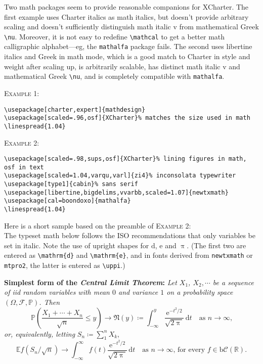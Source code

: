 \documentclass[11pt]{article}
\begin{document}
Two math packages seem to provide reasonable companions for \textsf{XCharter}. The first example uses Charter italics as math italics, but doesn't provide arbitrary scaling and doesn't sufficiently distinguish math italic v from mathematical Greek \verb|\nu|. Moreover, it is not easy to redefine \verb|\mathcal| to get a better math calligraphic alphabet---eg, the {\tt mathalfa} package fails. The second uses \textsf{libertine} italics and Greek in math mode, which is a good match to Charter in style and weight after scaling up, is arbitrarily scalable, has distinct math italic v and mathematical Greek \verb|\nu|, and is completely compatible with {\tt mathalfa}.

\textsc{Example 1:}
\begin{verbatim}
\usepackage[charter,expert]{mathdesign}
\usepackage[scaled=.96,osf]{XCharter}% matches the size used in math
\linespread{1.04}
\end{verbatim}

\textsc{Example 2:}
\begin{verbatim}
\usepackage[scaled=.98,sups,osf]{XCharter}% lining figures in math, osf in text
\usepackage[scaled=1.04,varqu,varl]{zi4}% inconsolata typewriter
\usepackage[type1]{cabin}% sans serif
\usepackage[libertine,bigdelims,vvarbb,scaled=1.07]{newtxmath}
\usepackage[cal=boondoxo]{mathalfa}
\linespread{1.04}
\end{verbatim}
Here is a short sample based on the preamble of \textsc{Example 2}:\\[4pt]
\def\Pr{\ensuremath{\mathbb{P}}}
\def\rmd{\mathrm{d}}
The typeset math below follows the ISO recommendations that only variables
be set in italic. Note the use of upright shapes for $\rmd$, $\mathrm{e}$
and $\uppi$. (The first two are entered as \verb|\mathrm{d}| and
\verb|\mathrm{e}|, and in fonts derived from {\tt newtxmath} or {\tt mtpro2},
 the latter is entered as \verb|\uppi|.)

\textbf{Simplest form of the \textit{Central Limit Theorem}:} \textit{Let
$X_1$, $X_2,\cdots$ be a sequence of iid random variables with mean $0$ 
and variance $1$ on a probability space $(\Omega,\mathcal{F},\Pr)$. Then}
\[\Pr\left(\frac{X_1+\cdots+X_n}{\sqrt{n}}\le y\right)\to\mathfrak{N}(y)\coloneq
\int_{-\infty}^y \frac{\mathrm{e}^{-t^2/2}}{\sqrt{2\uppi}}\,
\mathrm{d}t\quad\mbox{as $n\to\infty$,}\]
\textit{or, equivalently, letting} $S_n\coloneq\sum_1^n X_k$,
\[\mathbb{E} f\left(S_n/\sqrt{n}\right)\to \int_{-\infty}^\infty f(t)
\frac{\mathrm{e}^{-t^2/2}}{\sqrt{2\uppi}}\,\mathrm{d}t
\quad\mbox{as $n\to\infty$, for every $f\in\mathrm{b}
\mathcal{C}(\mathbb{R})$.}\]
\end{document}
